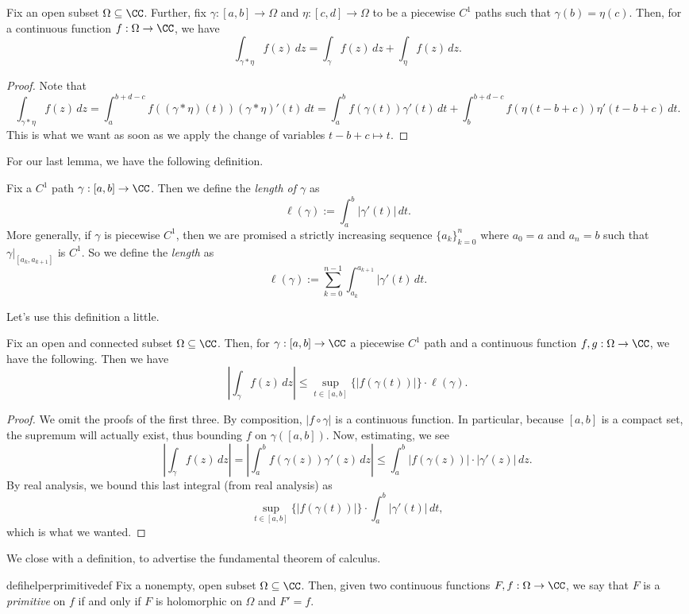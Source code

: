 \begin{lemma} \label{lem:concatintegral}
	Fix an open subset $\Omega\subseteq\CC$. Further, fix $\gamma:[a,b]\to\Omega$ and $\eta:[c,d]\to\Omega$ to be a piecewise $C^1$ paths such that $\gamma(b)=\eta(c)$. Then, for a continuous function $f:\Omega\to\CC$, we have
	\[\int_{\gamma*\eta}f(z)\,dz=\int_\gamma f(z)\,dz+\int_\eta f(z)\,dz.\]
\end{lemma}
\begin{proof}
	Note that
	\[\int_{\gamma*\eta}f(z)\,dz=\int_a^{b+d-c}f((\gamma*\eta)(t))(\gamma*\eta)'(t)\,dt=\int_a^bf(\gamma(t))\gamma'(t)\,dt+\int_{b}^{b+d-c}f(\eta(t-b+c))\eta'(t-b+c)\,dt.\]
	This is what we want as soon as we apply the change of variables $t-b+c\mapsto t$.
\end{proof}
For our last lemma, we have the following definition.
\begin{definition}[Length]
	Fix a $C^1$ path $\gamma:[a,b]\to\CC$. Then we define the \textit{length of $\gamma$} as
	\[\ell(\gamma):=\int_a^b|\gamma'(t)|\,dt.\]
	More generally, if $\gamma$ is piecewise $C^1$, then we are promised a strictly increasing sequence $\{a_k\}_{k=0}^n$ where $a_0=a$ and $a_n=b$ such that $\gamma|_{[a_k,a_{k+1}]}$ is $C^1$. So we define the \textit{length} as
	\[\ell(\gamma):=\sum_{k=0}^{n-1}\int_{a_k}^{a_{k+1}}|\gamma'(t)\,dt.\]
\end{definition}
Let's use this definition a little.
\begin{proposition} \label{lem:estimation}
	Fix an open and connected subset $\Omega\subseteq\CC$. Then, for $\gamma:[a,b]\to\CC$ a piecewise $C^1$ path and a continuous function $f,g:\Omega\to\CC$, we have the following. Then we have
	\[\left|\int_\gamma f(z)\,dz\right|\le\sup_{t\in[a,b]}\{|f(\gamma(t))|\}\cdot\ell(\gamma).\]
\end{proposition}
\begin{proof}
	We omit the proofs of the first three. By composition, $|f\circ\gamma|$ is a continuous function. In particular, because $[a,b]$ is a compact set, the supremum will actually exist, thus bounding $f$ on $\gamma([a,b])$.  Now, estimating, we see
	\[\left|\int_\gamma f(z)\,dz\right|=\left|\int_a^bf(\gamma(z))\gamma'(z)\,dz\right|\le\int_a^b|f(\gamma(z))|\cdot|\gamma'(z)|\,dz.\]
	By real analysis, we bound this last integral (from real analysis) as
	\[\sup_{t\in[a,b]}\{|f(\gamma(t))|\}\cdot\int_a^b|\gamma'(t)|\,dt,\]
	which is what we wanted.
\end{proof}
We close with a definition, to advertise the fundamental theorem of calculus.
\begin{restatable}[Primitive]{defihelper}{primitivedef} 
	Fix a nonempty, open subset $\Omega\subseteq\CC$. Then, given two continuous functions $F,f:\Omega\to\CC$, we say that $F$ is a \textit{primitive} on $f$ if and only if $F$ is holomorphic on $\Omega$ and $F'=f$.
\end{restatable}